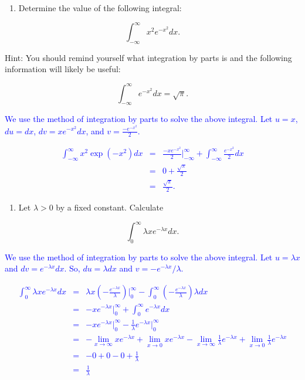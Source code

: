 \documentclass[
]{article}
\providecommand{\tightlist}{%
  \setlength{\itemsep}{0pt}\setlength{\parskip}{0pt}}
\begin{document}
\hfill\break

\begin{enumerate}
\def\labelenumi{\arabic{enumi}.}
\setcounter{enumi}{6}
\tightlist
\item
  Determine the value of the following integral:
\end{enumerate}

\[ \int_{-\infty}^{\infty} x^2 e^{-x^2} dx.\]

Hint: You should remind yourself what integration by parts is and the following information will likely be useful:

\[\int_{-\infty}^{\infty} e^{-x^2} dx = \sqrt{\pi}.\]

\textcolor{blue}{We use the method of integration by parts to solve the above integral. Let $u=x$, $du=dx$, $dv=x e^{-x^{2}}dx$, and $v=\frac{-e^{-x^2}}{2}$.}

\textcolor{blue}{
\begin{eqnarray}
\int_{-\infty }^{\infty } x^2 \exp \left(-x^2\right) dx & = & \frac{-xe^{-x^2}}{2}\Biggr|_{-\infty}^{\infty} + \int_{-\infty}^{\infty} \frac{e^{-x^2}}{2}dx \nonumber \\
& = & 0 + \frac{\sqrt{\pi}}{2} \nonumber \\
& = & \frac{\sqrt{\pi}}{2}.\nonumber
\end{eqnarray}
}

\hfill\break

\begin{enumerate}
\def\labelenumi{\arabic{enumi}.}
\setcounter{enumi}{7}
\tightlist
\item
  Let \(\lambda > 0\) by a fixed constant. Calculate
\end{enumerate}

\[\int_{0}^{\infty} \lambda x e^{-\lambda x}dx.\]

\textcolor{blue}{We use the method of integration by parts to solve the above integral. Let $u=\lambda x$ and $dv=e^{-\lambda x} dx$. So, $du=\lambda dx$ and $v=-e^{-\lambda x}/\lambda$.}

\textcolor{blue}{
\begin{eqnarray}
\int_{0}^{\infty} \lambda x e^{-\lambda x} dx & = & \lambda x \left(-\frac{e^{-\lambda x}}{\lambda}\right)\Biggr|_{0}^{\infty} - \int_{0}^{\infty} \left(-\frac{e^{-\lambda x}}{\lambda}\right) \lambda dx \nonumber \\
 & = & -x e^{-\lambda x}\Biggr|_{0}^{\infty} + \int_{0}^{\infty} e^{-\lambda x} dx \nonumber \\
 & = & - x e^{-\lambda x}\Biggr|_{0}^{\infty} - \frac{1}{\lambda}e^{-\lambda x}\Biggr|_{0}^{\infty} \nonumber \\
 & = & -\lim_{x\to\infty} x e^{-\lambda x} + \lim_{x\to0} x e^{-\lambda x} - \lim_{x\to\infty}\frac{1}{\lambda}e^{-\lambda x} + \lim_{x\to0}\frac{1}{\lambda}e^{-\lambda x} \nonumber \\
 & = & -0 + 0 - 0 + \frac{1}{\lambda} \nonumber \\
 & = & \frac{1}{\lambda} \nonumber
\end{eqnarray}
}
\end{document}
